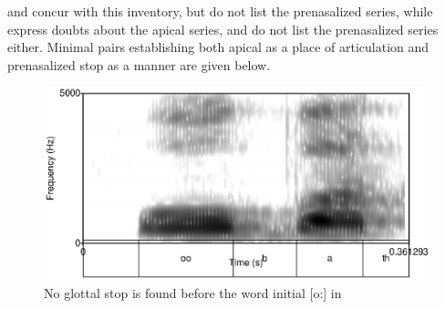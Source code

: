 

\citet{Bichsel} and \citet{Adelaar1991} concur with this inventory, but do not list the prenasalized series, while \citet{SmithEtAl2004} express doubts about the apical series, and do not list the prenasalized series either. Minimal pairs establishing both apical as a place of articulation and prenasalized stop as a manner are given below.

\begin{figure}
	\centering
		\includegraphics{pics/oobath.eps}
	\caption[Absence of a glottal stop before vocalic onset]{No glottal stop is found before the word initial [o:] in }
	\label{fig:phon:oobath}
\end{figure}

